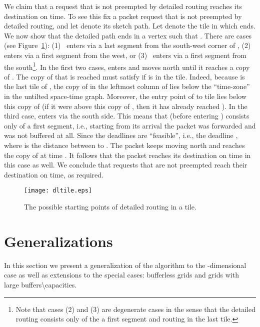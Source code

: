 \documentclass[11pt]{article}
\newenvironment{proof sketch}[1]{\noindent {\emph{Proof sketch of #1:}}}{\hfill \qed}
\begin{document}
We claim that a request that is not preempted by detailed routing reaches its destination on time.
To see this fix a packet request  that is not preempted by detailed routing, and
let  denote its sketch path. Let  denote the tile in which  ends.  We now show that the detailed path  ends in a vertex  such
that .  There are  cases (see
Figure~\ref{fig:dltile}): (1)~ enters  via a last segment from
the south-west corner of , (2)~ enters  via a first segment from the west,
or (3)~ enters  via a first segment from the south\footnote{ Note that
  cases (2) and (3) are degenerate cases in the sense that the detailed routing
  consists only of the a first segment and routing in the last tile.}.  In the first two cases,  enters  and moves north
until it reaches a copy of .  The copy  of  that is reached must
satisfy  if  is in the tile.  Indeed, because  is the last
tile of , the copy of  in the leftmost column of  lies below the
``time-zone''  in the untilted space-time graph. Moreover, the entry point
of  to tile  lies below this copy of  (if it were above this copy of
, then it has already reached ).  In the third case,  enters via the
south side. This means that (before entering )  consists only of a first
segment, i.e., starting from its arrival the packet was forwarded and was not
buffered at all.  Since the deadlines are ``feasible'', i.e., the deadline , where  is the distance between  to .
The packet keeps moving north and reaches the copy of  at time . It follows that the packet reaches its destination on time in this
case as well.  We conclude that requests that are not preempted reach their
destination on time, as required.

\begin{figure}[H]
  \centering
    \texttt{[image: dltile.eps]}
  \caption{The  possible starting points of detailed routing in a tile.}
    \label{fig:dltile}
\end{figure}

\section{Generalizations}\label{sec:generalizations}
In this section we present a generalization of the algorithm to the -dimensional case as well as extensions to the special cases: bufferless grids and grids with large buffers\textbackslash capacities.
\end{document}
